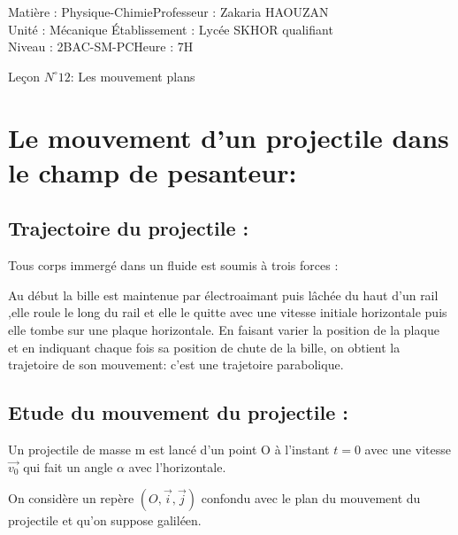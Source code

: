 \documentclass[12pt]{article}
\author{Zakaria HAOUZAN}
\date{\today}
\newcommand\headerMe[2]{\noindent{}#1\hfill#2}
\begin{document}
\headerMe{Matière : Physique-Chimie}{Professeur : Zakaria HAOUZAN}\\
\headerMe{Unité : Mécanique }{Établissement : Lycée SKHOR qualifiant}\\
\headerMe{Niveau : 2BAC-SM-PC}{Heure : 7H}\\

\begin{center}

    \Large{Leçon $N^{\circ} 12 $: \color{red} Les mouvement plans}
\end{center}


\section{Le mouvement d'un projectile dans le champ de pesanteur:}

\subsection{Trajectoire du projectile : }

Tous corps immergé dans un fluide est soumis à trois forces :  


Au début la bille est maintenue par électroaimant puis lâchée du haut d’un rail ,elle roule le long du rail et elle le
quitte avec une vitesse initiale horizontale puis elle tombe sur une plaque horizontale.
En faisant varier la position de la plaque et en indiquant chaque fois sa position de chute de la bille, on obtient la
trajetoire de son mouvement: c'est une trajetoire parabolique.

\subsection{Etude du mouvement du projectile :}

Un projectile de masse m est lancé d'un point O à l'instant $t=0$ avec une vitesse $\vec{v_0}$ qui fait un angle $\alpha$ avec l'horizontale.

On considère un repère $(O, \vec{i}, \vec{j})$ confondu avec le plan du mouvement du projectile et qu'on suppose galiléen.
\end{document}
